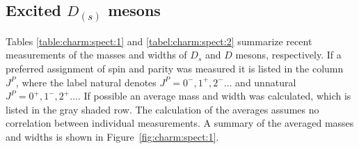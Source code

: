 \subsection{Excited \emph{$D_{(s)}$} mesons}

Tables \ref{table:charm:spect:1} and \ref{tabel:charm:spect:2} summarize recent measurements of the masses and widths of $D_{s}$ and $D$ mesons, respectively. If a preferred assignment of spin and parity was measured it is listed in the column $J^{P}$, where the label natural denotes $J^{P}=0^{-},1^{+},2^{-}\ldots$ and unnatural $J^{P}=0^{+},1^{-},2^{+}\ldots$. If possible an average mass and width was calculated, which is listed in the gray shaded row. The calculation of the averages assumes no correlation between individual measurements. A summary of the averaged masses and widths is shown in Figure~\ref{fig:charm:spect:1}. 
